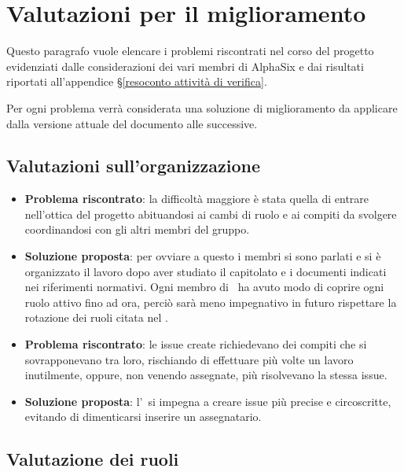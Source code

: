 \newpage
\section{Valutazioni per il miglioramento}	\label{valutazioni per il miglioramento}
	
	Questo paragrafo vuole elencare i problemi riscontrati nel corso del progetto evidenziati dalle considerazioni dei vari membri di AlphaSix e dai risultati riportati all'appendice \S\ref{resoconto attività di verifica}.
	
	Per ogni problema verrà considerata una soluzione di miglioramento da applicare dalla versione attuale del documento alle successive.

	\subsection{Valutazioni sull'organizzazione}
		\begin{itemize}
			\item \textbf{Problema riscontrato}: la difficoltà maggiore è stata quella di entrare nell'ottica del progetto abituandosi ai cambi di ruolo e ai compiti da svolgere coordinandosi con gli altri membri del gruppo.
			\item \textbf{Soluzione proposta}: per ovviare a questo i membri si sono parlati e si è organizzato il lavoro dopo aver studiato il capitolato e i documenti indicati nei riferimenti normativi. Ogni membro di \gruppo\ ha avuto modo di coprire ogni ruolo attivo fino ad ora, perciò sarà meno impegnativo in futuro rispettare la rotazione dei ruoli citata nel \PdPd.
			\item \textbf{Problema riscontrato}: le issue create richiedevano dei compiti che si sovrapponevano tra loro, rischiando di effettuare più volte un lavoro inutilmente, oppure, non venendo assegnate, più  risolvevano la stessa issue.
			\item \textbf{Soluzione proposta}: l'\Amm\ si impegna a creare issue più precise e circoscritte, evitando di dimenticarsi inserire un assegnatario.
		\end{itemize}
	
	
	\subsection{Valutazione dei ruoli}
	
